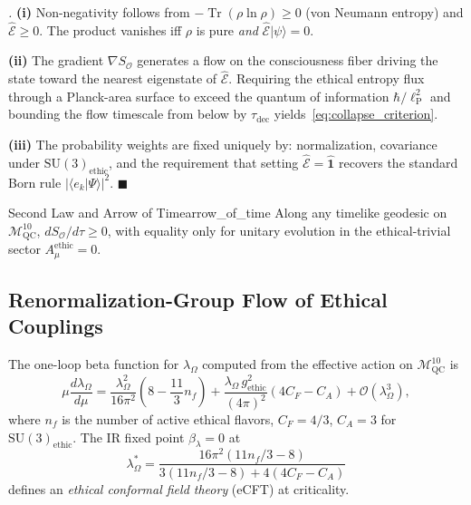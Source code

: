 \documentclass[12pt,a4paper]{article}
\theoremstyle{myrmk}
\renewenvironment{proof}[1][\proofname]{%
  \par\noindent\textit{#1.}\enspace\ignorespaces}{\hfill$\blacksquare$\par\medskip}
\newcommand{\Mmanifold}{\mathcal{M}^{10}_{\mathrm{QC}}}
\newcommand{\SO}{\nabla S_{\!\mathcal{O}}}
\newcommand{\lP}{\ell_{\mathrm{P}}}
\newcommand{\Tr}{\operatorname{Tr}}
\newcommand{\ket}[1]{|#1\rangle}
\newcommand{\braket}[2]{\langle#1|#2\rangle}
\begin{document}
\begin{proof}
\textbf{(i)} Non-negativity follows from $-\Tr(\rho\ln\rho)\geq0$ (von Neumann
entropy) and $\hat{\mathcal{E}}\geq0$. The product vanishes iff $\rho$ is pure
\emph{and} $\hat{\mathcal{E}}\ket{\psi}=0$.

\textbf{(ii)} The gradient $\SO$ generates a flow on the consciousness fiber driving
the state toward the nearest eigenstate of $\hat{\mathcal{E}}$. Requiring the
ethical entropy flux through a Planck-area surface to exceed the quantum of
information $\hbar/\lP^2$ and bounding the flow timescale from below by
$\tau_{\mathrm{dec}}$ yields~\eqref{eq:collapse_criterion}.

\textbf{(iii)} The probability weights are fixed uniquely by: normalization,
covariance under $\mathrm{SU}(3)_{\mathrm{ethic}}$, and the requirement that
setting $\hat{\mathcal{E}}=\hat{\mathbf{1}}$ recovers the standard Born rule
$|\braket{e_k}{\Psi}|^2$.
\end{proof}

\begin{corollary}{Second Law and Arrow of Time}{arrow_of_time}
Along any timelike geodesic on $\Mmanifold$,
$dS_{\mathcal{O}}/d\tau\geq0$,
with equality only for unitary evolution in the ethical-trivial sector
$A^{\mathrm{ethic}}_\mu=0$.
\end{corollary}

\subsection{Renormalization-Group Flow of Ethical Couplings}

The one-loop beta function for $\lambda_\Omega$ computed from the effective action
on $\Mmanifold$ is
\begin{equation}
  \mu\frac{d\lambda_\Omega}{d\mu}
  = \frac{\lambda_\Omega^2}{16\pi^2}\left(8 - \frac{11}{3}n_f\right)
    + \frac{\lambda_\Omega\,g_{\mathrm{ethic}}^2}{(4\pi)^2}\left(4C_F - C_A\right)
    + \mathcal{O}(\lambda_\Omega^3),
  \label{eq:beta_lambda}
\end{equation}
where $n_f$ is the number of active ethical flavors, $C_F=4/3$, $C_A=3$ for
$\mathrm{SU}(3)_{\mathrm{ethic}}$. The IR fixed point $\beta_\lambda=0$ at
\begin{equation}
  \lambda_\Omega^* = \frac{16\pi^2(11n_f/3-8)}{3(11n_f/3-8)+4(4C_F-C_A)}
  \label{eq:ethical_fixed_point}
\end{equation}
defines an \emph{ethical conformal field theory} (eCFT) at criticality.
\end{document}
